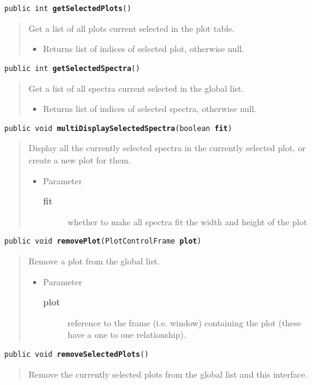 \documentclass[twoside,11pt,nolof]{starlink}
\providecommand{\method}[1]{\texttt{#1}}
\newenvironment{desc}{\begin{quote}}{\end{quote}}
\begin{document}
\method{public int \textbf{getSelectedPlots}()\label{l360}\label{l361}}
\begin{desc}Get a list of all plots current selected in the plot table.
\begin{itemize}
\item{Returns list of indices of selected plot, otherwise null. }
\end{itemize}
\end{desc}

\method{public int \textbf{getSelectedSpectra}()\label{l362}\label{l363}}
\begin{desc}Get a list of all spectra current selected in the global list.
\begin{itemize}
\item{Returns list of indices of selected spectra, otherwise null. }
\end{itemize}
\end{desc}

\method{public void \textbf{multiDisplaySelectedSpectra}(\texttt{boolean} \textbf{fit})\label{l364}\label{l365}}
\begin{desc}Display all the currently selected spectra in the currently
 selected plot, or create a new plot for them.
\begin{itemize}
\item{Parameter
  \begin{description}
   \item[\textbf{fit}]{whether to make all spectra fit the width and height
            of the plot}
  \end{description}}
\end{itemize}
\end{desc}

\method{public void \textbf{removePlot}(\texttt{PlotControlFrame} \textbf{plot})\label{l366}\label{l367}}
\begin{desc}Remove a plot from the global list.
\begin{itemize}
\item{Parameter
  \begin{description}
   \item[\textbf{plot}]{reference to the frame (i.e. window) containing the
             plot (these have a one to one relationship).}
  \end{description}}
\end{itemize}
\end{desc}

\method{public void \textbf{removeSelectedPlots}()\label{l368}\label{l369}}
\begin{desc}Remove the currently selected plots from the global list and
 this interface.
\end{desc}
\end{document}

